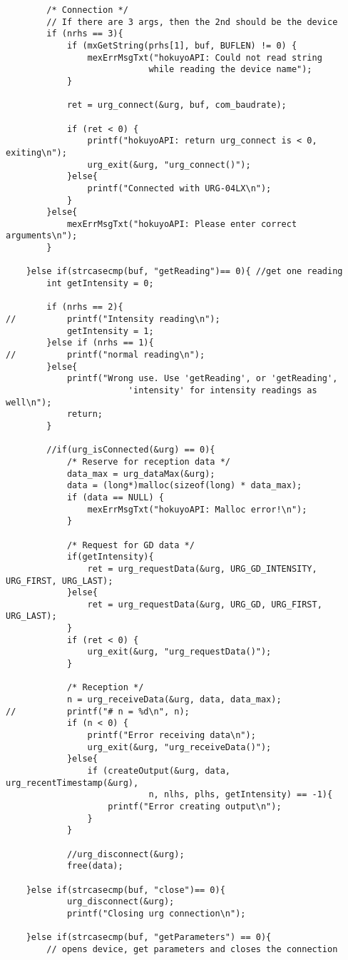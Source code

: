\begin{lstlisting}
        /* Connection */
        // If there are 3 args, then the 2nd should be the device 
        if (nrhs == 3){
        	if (mxGetString(prhs[1], buf, BUFLEN) != 0) {
        		mexErrMsgTxt("hokuyoAPI: Could not read string 
                            while reading the device name");
        	}

        	ret = urg_connect(&urg, buf, com_baudrate);

        	if (ret < 0) {
        		printf("hokuyoAPI: return urg_connect is < 0, exiting\n");
        		urg_exit(&urg, "urg_connect()");
        	}else{
        		printf("Connected with URG-04LX\n");
        	}
        }else{
        	mexErrMsgTxt("hokuyoAPI: Please enter correct arguments\n");
        }

    }else if(strcasecmp(buf, "getReading")== 0){ //get one reading
    	int getIntensity = 0;

    	if (nrhs == 2){
//    		printf("Intensity reading\n");
    		getIntensity = 1;
    	}else if (nrhs == 1){
//    		printf("normal reading\n");
    	}else{
    		printf("Wrong use. Use 'getReading', or 'getReading', 
                        'intensity' for intensity readings as well\n");
    		return;
    	}

    	//if(urg_isConnected(&urg) == 0){
    		/* Reserve for reception data */
    		data_max = urg_dataMax(&urg);
    		data = (long*)malloc(sizeof(long) * data_max);
    		if (data == NULL) {
    			mexErrMsgTxt("hokuyoAPI: Malloc error!\n");
    		}

    		/* Request for GD data */
    		if(getIntensity){
    			ret = urg_requestData(&urg, URG_GD_INTENSITY, URG_FIRST, URG_LAST);
    		}else{
    			ret = urg_requestData(&urg, URG_GD, URG_FIRST, URG_LAST);
    		}
    		if (ret < 0) {
    			urg_exit(&urg, "urg_requestData()");
    		}

    		/* Reception */
    		n = urg_receiveData(&urg, data, data_max);
//    		printf("# n = %d\n", n);
    		if (n < 0) {
    			printf("Error receiving data\n");
    			urg_exit(&urg, "urg_receiveData()");
    		}else{
    			if (createOutput(&urg, data, urg_recentTimestamp(&urg), 
                            n, nlhs, plhs, getIntensity) == -1){
    				printf("Error creating output\n");
    			}
    		}

            //urg_disconnect(&urg);
    		free(data);

    }else if(strcasecmp(buf, "close")== 0){
    		urg_disconnect(&urg);
    		printf("Closing urg connection\n");

    }else if(strcasecmp(buf, "getParameters") == 0){ 
        // opens device, get parameters and closes the connection


\end{lstlisting}

